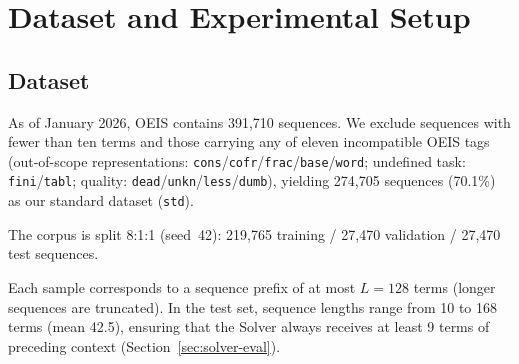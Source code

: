 
\section{Dataset and Experimental Setup}
\label{sec:setup}

\subsection{Dataset}
\label{sec:dataset}

As of January 2026, OEIS contains 391,710 sequences. We exclude sequences with fewer than ten
terms and those carrying any of eleven incompatible OEIS tags (out-of-scope representations:
\texttt{cons}/\texttt{cofr}/\texttt{frac}/\texttt{base}/\texttt{word}; undefined task:
\texttt{fini}/\texttt{tabl}; quality: \texttt{dead}/\texttt{unkn}/\texttt{less}/\texttt{dumb}),
yielding 274,705 sequences (70.1\%) as our standard dataset (\texttt{std}).

The corpus is split 8:1:1 (seed~42): 219,765 training / 27,470 validation / 27,470 test sequences.

Each sample corresponds to a sequence prefix of at most $L = 128$ terms (longer sequences are
truncated). In the test set, sequence lengths range from 10 to 168 terms (mean 42.5), ensuring
that the Solver always receives at least 9 terms of preceding context (Section~\ref{sec:solver-eval}).

